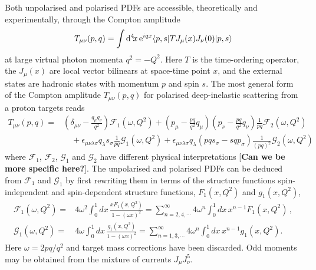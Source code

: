 Both unpolarised and polarised PDFs are accessible, theoretically and experimentally, through the Compton amplitude
\begin{equation}
T_{\mu\nu}(p,q) = \int {\rm d}^4\!x\, {\rm e}^{iqx}  \langle p,s |T J_\mu(x) J_\nu(0)|p,s\rangle   
\end{equation}
at large virtual photon momenta $q^2=-Q^2$. Here $T$ is the time-ordering operator, the $J_\mu(x)$ are local vector bilinears at space-time point $x$, and the external states are hadronic states with momentum $p$ and spin $s$. The most general form of the Compton amplitude $T_{\mu\nu}(p,q)$ for polarised deep-inelastic scattering from a proton targets reads
\begin{align}
T_{\mu\nu}(p,q) = {} & \left(\delta_{\mu\nu}-\frac{q_\mu q_\nu}{q^2}\right) \mathcal{F}_1(\omega,Q^2) + \left(p_\mu-\frac{pq}{q^2}q_\mu\right) \left(p_\nu-\frac{pq}{q^2}q_\nu\right) \frac{1}{pq} \mathcal{F}_2(\omega,Q^2)\\ 
& {} \quad  + \epsilon_{\mu\nu\lambda\sigma}q_\lambda s_\sigma \frac{1}{pq}\mathcal{G}_1(\omega,Q^2) + \epsilon_{\mu\nu\lambda\sigma}q_\lambda \left(pq s_\sigma - sq p_\sigma\right) \frac{1}{(pq)^2}\mathcal{G}_2(\omega,Q^2)
\end{align}
where $\mathcal{F}_1$, $\mathcal{F}_2$, $\mathcal{G}_1$ and $\mathcal{G}_2$ have different physical interpretations [\textbf{Can we be more specific here?}]. The unpolarised and polarised PDFs can be deduced from $\mathcal{F}_1$ and $\mathcal{G}_1$ by first rewriting them in terms of the structure functions spin-independent and spin-dependent structure functions, $F_1(x,Q^2)$ and $g_1(x,Q^2)$,
\begin{align}
\mathcal{F}_1(\omega,Q^2) = {} & 4 \omega^2 \int_0^1 dx\,  \frac{xF_1(x,Q^2)}{1-(\omega x)^2} = \sum_{n=2,4,\cdots}^\infty 4\omega^n \int_0^1 dx\, x^{n-1} F_1(x,Q^2) \,, \\
\mathcal{G}_1(\omega,Q^2) = {} & 4 \omega \int_0^1 dx\, \frac{g_1(x,Q^2)}{1-(\omega x)^2} = \sum_{n=1,3,\cdots}^\infty 4\omega^n \int_0^1 dx\, x^{n-1} g_1(x,Q^2).
\end{align}
Here $\omega=2pq/q^2$ and target mass corrections have been discarded. Odd moments may be obtained from the mixture of currents $J_\mu J_\nu^5$.

